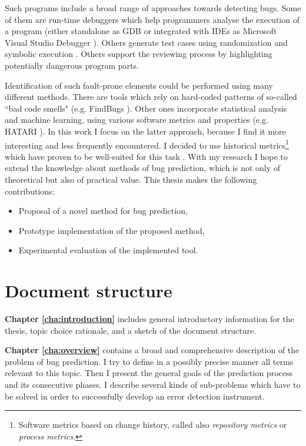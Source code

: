 \documentclass{pracamgr}
\begin{document}
Such programs include a broad range of approaches towards detecting bugs. Some of them are run-time debuggers which help programmers analyse the execution of a program (either standalone as GDB \cite{gdb} or integrated with IDEs as Microsoft Visual Studio Debugger \cite{vs_debugger}). Others generate test cases using randomization and symbolic execution \cite{symbolic, puzzle}. Others support the reviewing process by highlighting potentially dangerous program parts.

Identification of such fault-prone elements could be performed using many different methods. There are tools which rely on hard-coded patterns of so-called ``bad code smells" (e.g. FindBugs \cite{findbugs}). Other ones incorporate statistical analysis and machine learning, using various software metrics and properties (e.g. HATARI \cite{hatari}). In this work I focus on the latter approach, because I find it more interesting and less frequently encountered. I decided to use historical metrics\footnote{Software metrics based on change history, called also \textit{repository metrics} or \textit{process metrics}.} which have proven to be well-suited for this task \cite{merits, comparative, how_and_why}. With my research I hope to extend the knowledge about methods of bug prediction, which is not only of theoretical but also of practical value. This thesis makes the following contributions:
\begin{itemize}
	\item Proposal of a novel method for bug prediction,
	\item Prototype implementation of the proposed method,
	\item Experimental evaluation of the implemented tool.
\end{itemize}

\section{Document structure}
\label{sec:structure}

\textbf{Chapter \ref{cha:introduction}} includes general introductory information for the thesis, topic choice rationale, and a sketch of the document structure. 

\medskip \noindent
\textbf{Chapter \ref{cha:overview}} contains a broad and comprehensive description of the problem of bug prediction. I try to define in a possibly precise manner all terms relevant to this topic. Then I present the general goals of the prediction process and its consecutive phases. I describe several kinds of sub-problems which have to be solved in order to successfully develop an error detection instrument.
\end{document}
